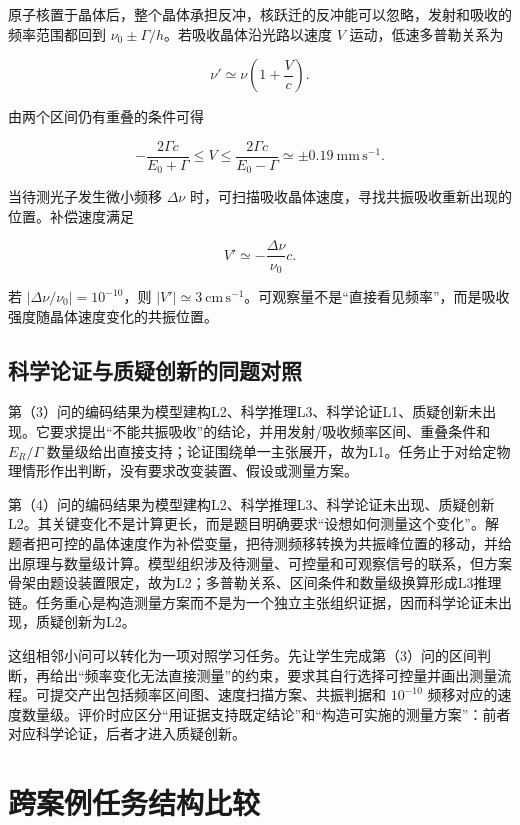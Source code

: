 \documentclass[
  12pt,
  a4paper,twoside,openany]{ctexbook}
\begin{document}
原子核置于晶体后，整个晶体承担反冲，核跃迁的反冲能可以忽略，发射和吸收的频率范围都回到
\(\nu_0\pm\Gamma/h\)。若吸收晶体沿光路以速度 \(V\)
运动，低速多普勒关系为

\[
\nu'\simeq\nu\!\left(1+\frac{V}{c}\right).
\]

由两个区间仍有重叠的条件可得

\[
-\frac{2\Gamma c}{E_0+\Gamma}
\leq V\leq
\frac{2\Gamma c}{E_0-\Gamma}
\simeq \pm0.19\ \mathrm{mm\,s^{-1}}.
\]

当待测光子发生微小频移 \(\Delta\nu\)
时，可扫描吸收晶体速度，寻找共振吸收重新出现的位置。补偿速度满足

\[
V'\simeq-\frac{\Delta\nu}{\nu_0}c.
\]

若 \(\left|\Delta\nu/\nu_0\right|=10^{-10}\)，则
\(\lvert V'\rvert\simeq3\ \mathrm{cm\,s^{-1}}\)。可观察量不是``直接看见频率''，而是吸收强度随晶体速度变化的共振位置。

\subsection{科学论证与质疑创新的同题对照}\label{ux79d1ux5b66ux8bbaux8bc1ux4e0eux8d28ux7591ux521bux65b0ux7684ux540cux9898ux5bf9ux7167}

第（3）问的编码结果为模型建构L2、科学推理L3、科学论证L1、质疑创新未出现。它要求提出``不能共振吸收''的结论，并用发射/吸收频率区间、重叠条件和
\(E_R/\Gamma\)
数量级给出直接支持；论证围绕单一主张展开，故为L1。任务止于对给定物理情形作出判断，没有要求改变装置、假设或测量方案。

第（4）问的编码结果为模型建构L2、科学推理L3、科学论证未出现、质疑创新L2。其关键变化不是计算更长，而是题目明确要求``设想如何测量这个变化''。解题者把可控的晶体速度作为补偿变量，把待测频移转换为共振峰位置的移动，并给出原理与数量级计算。模型组织涉及待测量、可控量和可观察信号的联系，但方案骨架由题设装置限定，故为L2；多普勒关系、区间条件和数量级换算形成L3推理链。任务重心是构造测量方案而不是为一个独立主张组织证据，因而科学论证未出现，质疑创新为L2。

这组相邻小问可以转化为一项对照学习任务。先让学生完成第（3）问的区间判断，再给出``频率变化无法直接测量''的约束，要求其自行选择可控量并画出测量流程。可提交产出包括频率区间图、速度扫描方案、共振判据和
\(10^{-10}\)
频移对应的速度数量级。评价时应区分``用证据支持既定结论''和``构造可实施的测量方案''：前者对应科学论证，后者才进入质疑创新。

\section{跨案例任务结构比较}\label{ux8de8ux6848ux4f8bux4efbux52a1ux7ed3ux6784ux6bd4ux8f83}
\end{document}
